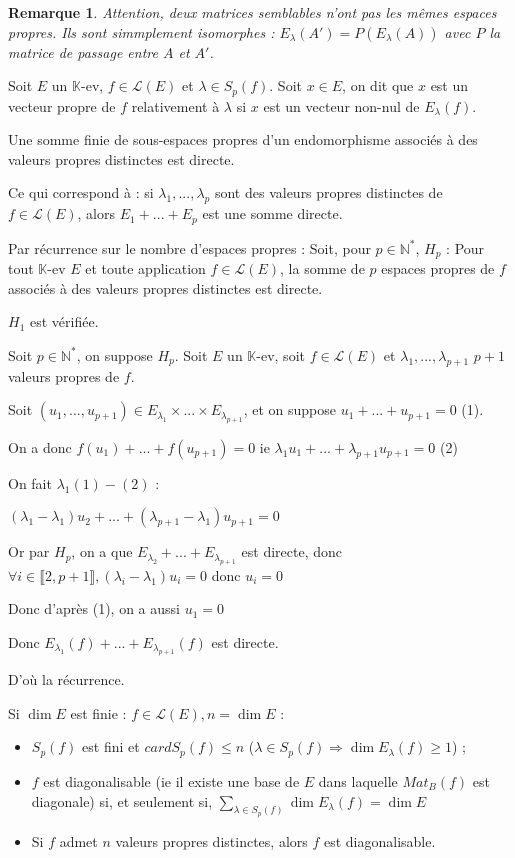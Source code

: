 \documentclass[a4paper,12pt]{book}
\newcommand{\Def}[2]{\begin{tcolorbox}[sharp corners, colback=white,colframe=blue!90!black!75, title=Définition : #1]#2\end{tcolorbox}}
\newcommand{\Thr}[2]{\begin{tcolorbox}[sharp corners, colback=white,colframe=red!90!black!75, title=Théorème : #1]#2\end{tcolorbox}}
\newcommand{\Prop}[2]{\begin{tcolorbox}[sharp corners, colback=white,colframe=red!90!black!75, title=Proposition : #1]#2\end{tcolorbox}}
\newcommand{\Pre}[1]{\begin{tcolorbox}[sharp corners, colback=white,colframe=green!60!green!30!black!75, title=Preuve]#1\end{tcolorbox}}
\newtheorem{Rem}{Remarque}[section]
\def\N{\mathbb{N}}
\def\K{\mathbb{K}}
\begin{document}
\begin{Rem}
Attention, deux matrices semblables n'ont pas les mêmes espaces propres. Ils sont simmplement isomorphes : $E_\lambda(A')=P(E_\lambda(A))$ avec $P$ la matrice de passage entre $A$ et $A'$.
\end{Rem}
\Def{Vecteur propre}{Soit $E$ un $\K$-ev, $f\in\mathcal{L}(E)$ et $\lambda\in S_p(f)$. Soit $x\in E$, on dit que $x$ est un vecteur propre de $f$ relativement à $\lambda$ si $x$ est un vecteur non-nul de $E_\lambda(f)$.}
\Thr{}{Une somme finie de sous-espaces propres d'un endomorphisme associés à des valeurs propres distinctes est directe.\par Ce qui correspond à : si $\lambda_1,...,\lambda_p$ sont des valeurs propres distinctes de $f\in\mathcal{L}(E)$, alors $E_1+...+E_p$ est une somme directe.}
\Pre{Par récurrence sur le nombre d'espaces propres : Soit, pour $p\in \N^*$, $H_p$ : Pour tout $\K$-ev $E$ et toute application $f\in\mathcal{L}(E)$, la somme de $p$ espaces propres de $f$ associés à des valeurs propres distinctes est directe.
\par $H_1$ est vérifiée. \par Soit $p\in\N^*$, on suppose $H_p$. Soit $E$ un $\K$-ev, soit $f\in\mathcal{L}(E)$ et $\lambda_1,...,\lambda_{p+1}$ $p+1$ valeurs propres de $f$. \par Soit $(u_1,..., u_{p+1})\in E_{\lambda_1}\times...\times E_{\lambda_{p+1}}$, et on suppose $u_1+...+u_{p+1}=0$ (1). \par On a donc $f(u_1)+...+f(u_{p+1})=0$ ie $\lambda_1 u_1 +...+\lambda_{p+1}u_{p+1}=0$ (2) \par On fait $\lambda_1(1)-(2)$ : \par $(\lambda_1-\lambda_1)u_2 +...+(\lambda_{p+1}-\lambda_1)u_{p+1}=0$
\par Or par $H_p$, on a que $E_{\lambda_2}+...+E_{\lambda_{p+1}}$ est directe, donc $\forall i\in\llbracket2,p+1\rrbracket, (\lambda_i-\lambda_1)u_i=0$ donc $u_i=0$ \par Donc d'après (1), on a aussi $u_1=0$ \par Donc $E_{\lambda_1}(f)+...+E_{\lambda_{p+1}}(f)$ est directe. \par D'où la récurrence.}
\Prop{Corollaire}{Si $\dim E$ est finie : $f\in\mathcal{L}(E), n=\dim E$ :\begin{itemize}
\item $S_p(f)$ est fini et $card S_p(f)\leq n$ ($\lambda \in S_p(f)\Rightarrow \dim E_\lambda(f)\geq 1$) ;
\item $f$ est diagonalisable (ie il existe une base de $E$ dans laquelle $Mat_B(f)$ est diagonale) si, et seulement si, $\sum\limits_{\lambda\in S_p(f)}\dim E_\lambda(f)=\dim E$
\item Si $f$ admet $n$ valeurs propres distinctes, alors $f$ est diagonalisable.
\end{itemize}}
\end{document}
